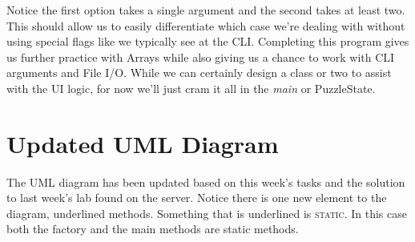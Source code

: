 \documentclass[nobib]{tufte-handout}
\begin{document}
Notice the first option takes a single argument and the second takes at least two. This should allow us to easily differentiate which case we're dealing with without using special flags like we typically see at the CLI. Completing this program gives us further practice with Arrays while also giving us a chance to work with CLI arguments and File I/O.  While we can certainly design a class or two to assist with the UI logic, for now we'll just cram it all in the \textit{main} or PuzzleState. 



\newpage \thispagestyle{empty}

\section{ Updated UML Diagram }

The UML diagram has been updated based on this week's tasks and the solution to last week's lab found on the server. Notice there is one new element to the diagram, underlined methods. Something that is underlined is \textsc{static}. In this case both the factory and the main methods are static methods. 
\end{document}
